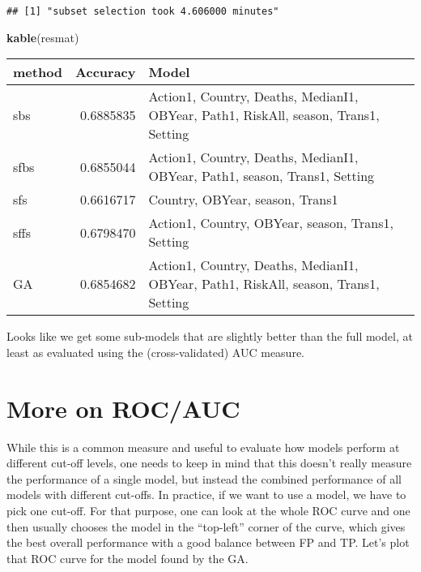 \documentclass[]{article}
\newenvironment{Shaded}{\begin{snugshade}}{\end{snugshade}}
\newcommand{\CommentTok}[1]{\textcolor[rgb]{0.56,0.35,0.01}{\textit{#1}}}
\newcommand{\DataTypeTok}[1]{\textcolor[rgb]{0.13,0.29,0.53}{#1}}
\newcommand{\DecValTok}[1]{\textcolor[rgb]{0.00,0.00,0.81}{#1}}
\newcommand{\KeywordTok}[1]{\textcolor[rgb]{0.13,0.29,0.53}{\textbf{#1}}}
\newcommand{\NormalTok}[1]{#1}
\newcommand{\OperatorTok}[1]{\textcolor[rgb]{0.81,0.36,0.00}{\textbf{#1}}}
\newcommand{\StringTok}[1]{\textcolor[rgb]{0.31,0.60,0.02}{#1}}
\begin{document}
\begin{verbatim}
## [1] "subset selection took 4.606000 minutes"
\end{verbatim}

\begin{Shaded}
\begin{Highlighting}[]
\KeywordTok{kable}\NormalTok{(resmat)}
\end{Highlighting}
\end{Shaded}

\begin{longtable}[]{@{}lrl@{}}
\toprule
method & Accuracy & Model\tabularnewline
\midrule
\endhead
sbs & 0.6885835 & Action1, Country, Deaths, MedianI1, OBYear, Path1,
RiskAll, season, Trans1, Setting\tabularnewline
sfbs & 0.6855044 & Action1, Country, Deaths, MedianI1, OBYear, Path1,
season, Trans1, Setting\tabularnewline
sfs & 0.6616717 & Country, OBYear, season, Trans1\tabularnewline
sffs & 0.6798470 & Action1, Country, OBYear, season, Trans1,
Setting\tabularnewline
GA & 0.6854682 & Action1, Country, Deaths, MedianI1, OBYear, Path1,
RiskAll, season, Trans1, Setting\tabularnewline
\bottomrule
\end{longtable}

Looks like we get some sub-models that are slightly better than the full
model, at least as evaluated using the (cross-validated) AUC measure.

\hypertarget{more-on-rocauc}{%
\section{More on ROC/AUC}\label{more-on-rocauc}}

While this is a common measure and useful to evaluate how models perform
at different cut-off levels, one needs to keep in mind that this doesn't
really measure the performance of a single model, but instead the
combined performance of all models with different cut-offs. In practice,
if we want to use a model, we have to pick one cut-off. For that
purpose, one can look at the whole ROC curve and one then usually
chooses the model in the ``top-left'' corner of the curve, which gives
the best overall performance with a good balance between FP and TP.
Let's plot that ROC curve for the model found by the GA.

\begin{Shaded}
\end{Shaded}
\end{document}
